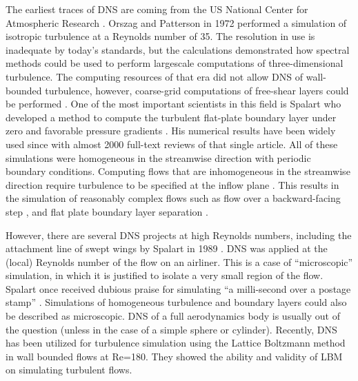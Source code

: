 \documentclass[12pt,oneside,a4paper,english]{article}
\begin{document}
The earliest traces of DNS are coming from the US National Center for Atmospheric Research \cite{Kardashian1998}. Orszag and Patterson \cite{PhysRevLett76} in 1972 performed a simulation of isotropic turbulence at a Reynolds number of 35. The resolution in use is inadequate by today's standards, but the calculations demonstrated how spectral methods could be used to perform largescale computations of three-dimensional turbulence. The computing resources of that era did not allow DNS of wall-bounded turbulence, however, coarse-grid computations of free-shear layers could be performed \cite{RILEY1980}. One of the most important scientists in this field is Spalart who developed a method to compute the turbulent flat-plate boundary layer under zero and favorable pressure gradients \cite{spalart_1988}. His numerical results have been widely used since with almost 2000 full-text reviews of that single article. All of these simulations were homogeneous in the streamwise direction with periodic boundary conditions. Computing flows that are inhomogeneous in the streamwise direction require turbulence to be specified at the inflow plane \cite{Kardashian1998}. This results in the simulation of reasonably complex flows such as flow over a backward-facing step \cite{le_moin_kim_1997}, and flat plate boundary layer separation \cite{kitsios_sekimoto_atkinson_2017}.

However, there are several DNS projects at high Reynolds numbers, including the attachment line of swept wings by Spalart in 1989 \cite{spalart1989direct}. DNS was applied at the (local) Reynolds number of the flow on an airliner. This is a case of ``microscopic'' simulation, in which it is justified to isolate a very small region of the flow. Spalart once received dubious praise for simulating ``a milli-second over a postage stamp'' \cite{laurence1999engineering}. Simulations of homogeneous turbulence and boundary layers could also be described as microscopic. DNS of a full aerodynamics body is usually out of the question (unless in the case of a simple sphere or cylinder). Recently, DNS has been utilized for turbulence simulation using the Lattice Boltzmann method \cite{wang2014direct} in wall bounded flows at Re=180. They showed the ability and validity of LBM on simulating turbulent flows.
\end{document}
